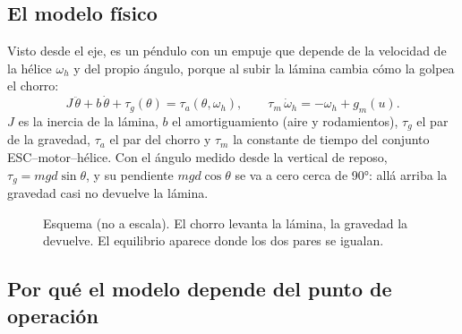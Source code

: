 \documentclass[11pt,letterpaper]{article}
\begin{document}
\subsection{El modelo físico}

Visto desde el eje, es un péndulo con un empuje que depende de la velocidad de la hélice $\omega_h$ y del propio ángulo, porque al subir la lámina cambia cómo la golpea el chorro:
\begin{equation}
J\,\ddot\theta + b\,\dot\theta + \tau_g(\theta) = \tau_a(\theta,\omega_h),
\qquad
\tau_m\,\dot\omega_h = -\omega_h + g_m(u).
\label{eq:fisico}
\end{equation}
$J$ es la inercia de la lámina, $b$ el amortiguamiento (aire y rodamientos), $\tau_g$ el par de la gravedad, $\tau_a$ el par del chorro y $\tau_m$ la constante de tiempo del conjunto ESC--motor--hélice. Con el ángulo medido desde la vertical de reposo, $\tau_g = m g d\sin\theta$, y su pendiente $m g d\cos\theta$ se va a cero cerca de 90°: allá arriba la gravedad casi no devuelve la lámina.

\begin{figure}[H]\centering
{}
\caption{Esquema (no a escala). El chorro levanta la lámina, la gravedad la devuelve. El equilibrio aparece donde los dos pares se igualan.}\label{fig:pendulo}
\end{figure}

\subsection{Por qué el modelo depende del punto de operación}
\end{document}
